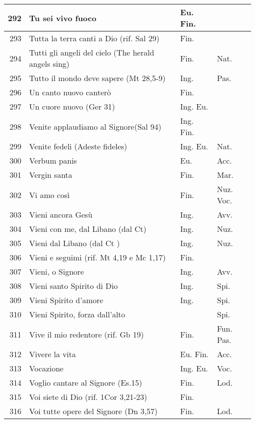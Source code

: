{\begin{center}
\begin{longtable}{ | r | m{4.7cm} | m{1.8cm} | m{2cm}  |}
    292 & Tu sei vivo fuoco & Eu. Fin. & \\ \hline
    293 & Tutta la terra canti a Dio (rif. Sal 29) & Fin. & \\ \hline
    294 & Tutti gli angeli del cielo (The herald angels sing) & Fin. & Nat.\\ \hline
    295 & Tutto il mondo deve sapere (Mt 28,5-9) & Ing. & Pas.\\ \hline
    296 & Un canto nuovo canterò & Fin. & \\ \hline
    297 & Un cuore nuovo (Ger 31) & Ing. Eu. & \\ \hline
    298 & Venite applaudiamo al Signore(Sal 94) & Ing. Fin. & \\ \hline
    299 & Venite fedeli (Adeste fideles) & Ing. Eu. & Nat.\\ \hline
    300 & Verbum panis & Eu. & Acc.\\ \hline
    301 & Vergin santa & Fin. & Mar.\\ \hline
    302 & Vi amo così & Fin. & Nuz. Voc.\\ \hline
    303 & Vieni ancora Gesù & Ing. & Avv.\\ \hline
    304 & Vieni con me, dal Libano (dal Ct) & Ing. & Nuz.\\ \hline
    305 & Vieni dal Libano (dal Ct ) & Ing. & Nuz.\\ \hline
    306 & Vieni e seguimi (rif. Mt 4,19 e Mc 1,17) & Fin. & \\ \hline
    307 & Vieni, o Signore & Ing. & Avv.\\ \hline
    308 & Vieni santo Spirito di Dio & Ing. & Spi.\\ \hline
    309 & Vieni Spirito d'amore & Ing. & Spi.\\ \hline
    310 & Vieni Spirito, forza dall'alto &  & Spi.\\ \hline
    311 & Vive il mio redentore (rif. Gb 19) & Fin. & Fun. Pas.\\ \hline
    312 & Vivere la vita & Eu. Fin. & Acc.\\ \hline
    313 & Vocazione & Ing. Eu. & Voc.\\ \hline
    314 & Voglio cantare al Signore (Es.15) & Fin. & Lod.\\ \hline
    315 & Voi siete di Dio (rif. 1Cor 3,21-23) & Fin. & \\ \hline
    316 & Voi tutte opere del Signore (Dn 3,57) & Fin. & Lod.\\ \hline
  \end{longtable}
\end{center}
}





